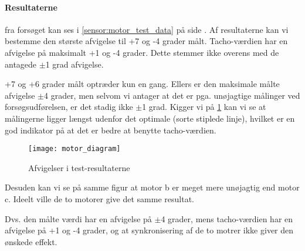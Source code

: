 \paragraph{Resultaterne} fra forsøget kan ses i \cref{sensor:motor_test_data} på side \pageref{sensor:motor_test_data}.
Af resultaterne kan vi bestemme den største afvigelse til +7 og -4 grader målt.
Tacho-værdien har en afvigelse på maksimalt +1 og -4 grader.
Dette stemmer ikke overens med de antagede $\pm$1 grad afvigelse.

+7 og +6 grader målt optræder kun en gang.
Ellers er den maksimale målte afvigelse $\pm$4 grader, men selvom vi antager at det er pga. unøjagtige målinger ved forsøgsudførelsen, er det stadig ikke $\pm$1 grad.
Kigger vi på \cref{sensor:motor_sensor_diagram} kan vi se at målingerne ligger længst udenfor det optimale (sorte stiplede linje), hvilket er en god indikator på at det er bedre at benytte tacho-værdien.

\begin{figure}
\texttt{[image: motor\_diagram]}
\caption{Afvigelser i test-resultaterne}
\label{sensor:motor_sensor_diagram}
\end{figure}

Desuden kan vi se på samme figur at motor b er meget mere unøjagtig end motor c.
Ideelt ville de to motorer give det samme resultat.

Dvs. den målte værdi har en afvigelse på $\pm$4 grader, mens tacho-værdien har en afvigelse på +1 og -4 grader, og at synkronisering af de to motrer ikke giver den ønskede effekt.
